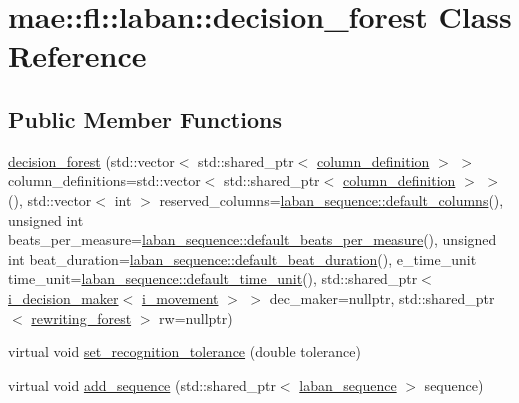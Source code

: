 \hypertarget{classmae_1_1fl_1_1laban_1_1decision__forest}{\section{mae\-:\-:fl\-:\-:laban\-:\-:decision\-\_\-forest Class Reference}
\label{classmae_1_1fl_1_1laban_1_1decision__forest}
}
\subsection*{Public Member Functions}
\begin{DoxyCompactItemize}
\item 
\hyperlink{classmae_1_1fl_1_1laban_1_1decision__forest_af04ed42b665c58b4ba3aa7248e0be0a8}{decision\-\_\-forest} (std\-::vector$<$ std\-::shared\-\_\-ptr$<$ \hyperlink{classmae_1_1fl_1_1laban_1_1column__definition}{column\-\_\-definition} $>$ $>$ column\-\_\-definitions=std\-::vector$<$ std\-::shared\-\_\-ptr$<$ \hyperlink{classmae_1_1fl_1_1laban_1_1column__definition}{column\-\_\-definition} $>$ $>$(), std\-::vector$<$ int $>$ reserved\-\_\-columns=\hyperlink{classmae_1_1fl_1_1laban_1_1laban__sequence_adda43b657712484d90b4ef3927a81128}{laban\-\_\-sequence\-::default\-\_\-columns}(), unsigned int beats\-\_\-per\-\_\-measure=\hyperlink{classmae_1_1fl_1_1laban_1_1laban__sequence_a2e64362d5cfeb89eb8545cb064e63170}{laban\-\_\-sequence\-::default\-\_\-beats\-\_\-per\-\_\-measure}(), unsigned int beat\-\_\-duration=\hyperlink{classmae_1_1fl_1_1laban_1_1laban__sequence_ac7bf04cdac0c3aed6b8ee4a887e561d9}{laban\-\_\-sequence\-::default\-\_\-beat\-\_\-duration}(), e\-\_\-time\-\_\-unit time\-\_\-unit=\hyperlink{classmae_1_1fl_1_1laban_1_1laban__sequence_ada28215d43d85e983fe6129e9816eed2}{laban\-\_\-sequence\-::default\-\_\-time\-\_\-unit}(), std\-::shared\-\_\-ptr$<$ \hyperlink{classmae_1_1fl_1_1laban_1_1i__decision__maker}{i\-\_\-decision\-\_\-maker}$<$ \hyperlink{classmae_1_1fl_1_1laban_1_1i__movement}{i\-\_\-movement} $>$ $>$ dec\-\_\-maker=nullptr, std\-::shared\-\_\-ptr$<$ \hyperlink{classmae_1_1fl_1_1laban_1_1rewriting__forest}{rewriting\-\_\-forest} $>$ rw=nullptr)
\item 
virtual void \hyperlink{classmae_1_1fl_1_1laban_1_1decision__forest_a7308f844dea15ccb31b7c85529388c04}{set\-\_\-recognition\-\_\-tolerance} (double tolerance)
\item 
virtual void \hyperlink{classmae_1_1fl_1_1laban_1_1decision__forest_a4794a8981cd0cfeb55a00ec6a5d01edf}{add\-\_\-sequence} (std\-::shared\-\_\-ptr$<$ \hyperlink{classmae_1_1fl_1_1laban_1_1laban__sequence}{laban\-\_\-sequence} $>$ sequence)

\end{DoxyCompactItemize}
